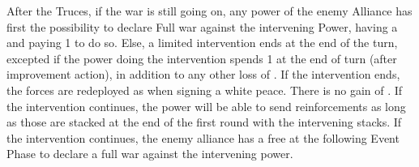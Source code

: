 \bparag After the Truces, if the war is still going on, any power of the enemy
Alliance has first the possibility to declare Full war against the intervening
Power, having a \CB and paying 1 \STAB to do so.
\bparag Else, a limited intervention ends at the end of the turn, excepted if
the power doing the intervention spends 1 \STAB at the end of turn (after
\STAB improvement action), in addition to any other loss of \STAB.
\bparag If the intervention ends, the forces are redeployed as when signing a
white peace. There is no gain of \STAB.
\bparag If the intervention continues, the power will be able to send
reinforcements as long as those are stacked at the end of the first round with
the intervening stacks.
\bparag If the intervention continues, the enemy alliance has a free \CB at
the following Event Phase to declare a full war against the intervening power.

